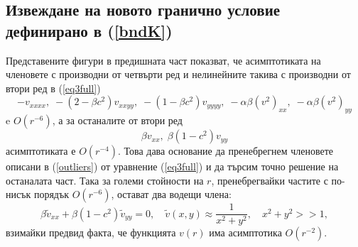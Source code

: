 \documentclass{article}
\newcommand{\be}{\begin{equation}}
\newcommand{\ee}{\end{equation}}
\newcommand{\rf}[1]{(\ref{#1})}
\begin{document}
\subsection{Извеждане на новото гранично условие дефинирано в \rf{bndK} }
Представените фигури в предишната част показват, че асимптотиката на членовете с производни от четвърти ред и нелинейните такива с производни от втори ред в \rf{eq3full}
\be\label{outliers}
- v_{xxxx}, \;  - (2-\beta c^2)v_{xxyy},  \;  - (1-\beta c^2)v_{yyyy}, \;  - \alpha \beta (v^2)_{xx}, \; - \alpha \beta (v^2)_{yy}
\ee
e $O(r^{-6})$, а за останалите от втори ред
$$
\beta v_{xx}, \; \beta (1-c^2) v_{yy}
$$
асимптотиката е $O(r^{-4})$. Това дава основание да пренебрегнем членовете описани в \rf{outliers} от уравнение \rf{eq3full} и да търсим точно решение на останалата част. Така за големи стойности на $r$, пренебрегвайки частите с по-нисък порядък $O(r^{-6})$, остават два водещи члена:
\be\label{asymptEq}
\beta \tilde v_{xx} + \beta (1-c^2) \tilde v_{yy} =0, \quad \tilde v(x,y) \approx \frac{1}{x^2 + y^2}, \quad x^2 + y^2 >>1,
\ee
взимайки предвид факта, че функцията $v(r)$ има асимптотика $O(r^{-2})$.
\end{document}

